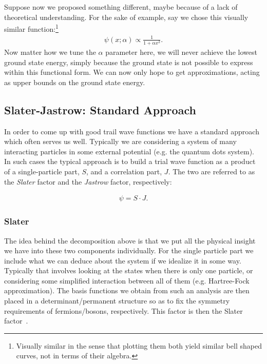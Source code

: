 \documentclass[Thesis.tex]{subfiles}
\begin{document}
Suppose now we proposed something different, maybe because of a lack of theoretical
understanding. For the sake of example, say we chose this visually similar
function:\footnote{Visually similar in the sense that plotting them both yield similar bell
shaped curves, not in terms of their algebra.}
\begin{align}
    \psi(x; \alpha)\propto \frac{1}{1 + \alpha x^2}.
\end{align}
Now matter how we tune the $\alpha$ parameter here, we will never achieve the lowest
ground state energy, simply because the ground state is not possible to express within this
functional form. We can now only hope to get approximations, acting as upper bounds on the
ground state energy.

\subsection{Slater-Jastrow: Standard Approach}
\label{sec:slater-jastrow}

In order to come up with good trail wave functions we have a standard approach which often
serves us well. Typically we are considering a system of many interacting particles in
some external potential (e.g. the quantum dots system). In such cases the typical approach
is to build a trial wave function as a product of a single-particle part, $S$, and a correlation
part, $J$. The two are referred to as the \emph{Slater} factor and the
\emph{Jastrow} factor, respectively:

\begin{align}
    \psi = S\cdot J.
\end{align}

\subsubsection*{Slater}

The idea behind the decomposition above is that we put all the physical insight we have into these
two components individually. For the single particle part we include what we can deduce
about the system if we idealize it in some way. Typically that involves looking at the
states when there is only one particle, or considering some simplified interaction between
all of them (e.g. Hartree-Fock approximation). The basis functions we obtain from such an
analysis are then placed in a determinant/permanent structure so as to fix the symmetry
requirements of fermions/bosons, respectively. This factor is then the Slater
factor~\cite{Slater-1929,Dirac-1926}.
\end{document}
